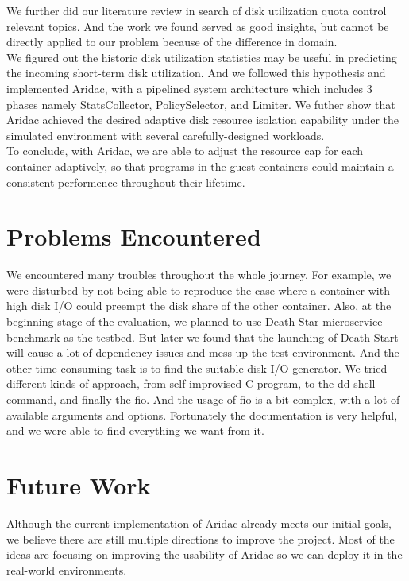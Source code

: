 \documentclass[10pt, conference,compsoc]{IEEEtran}
\begin{document}
We further did our literature review in search of disk utilization quota control relevant topics. And the work we found served as good insights, but cannot be directly applied to our problem because of the difference in domain. \\

We figured out the historic disk utilization statistics may be useful in predicting the incoming short-term disk utilization. And we followed this hypothesis and implemented Aridac, with a pipelined system architecture which includes 3 phases namely StatsCollector, PolicySelector, and Limiter. We futher show that Aridac achieved the desired adaptive disk resource isolation capability under the simulated environment with several carefully-designed workloads.\\

To conclude, with Aridac, we are able to adjust the resource cap for each container adaptively, so that programs in the guest containers could maintain a consistent performence throughout their lifetime.

\section{Problems Encountered}
We encountered many troubles throughout the whole journey. For example, we were disturbed by not being able to reproduce the case where a container with high disk I/O could preempt the disk share of the other container. Also, at the beginning stage of the evaluation, we planned to use Death Star microservice benchmark as the testbed. But later we found that the launching of Death Start will cause a lot of dependency issues and mess up the test environment. And the other time-consuming task is to find the suitable disk I/O generator. We tried different kinds of approach, from self-improvised C program, to the dd shell command, and finally the fio. And the usage of fio is a bit complex, with a lot of available arguments and options. Fortunately the documentation is very helpful, and we were able to find everything we want from it.\\

\section{Future Work}
Although the current implementation of Aridac already meets our initial goals, we believe there are still multiple directions to improve the project. Most of the ideas are focusing on improving the usability of Aridac so we can deploy it in the real-world environments.\\
\end{document}
